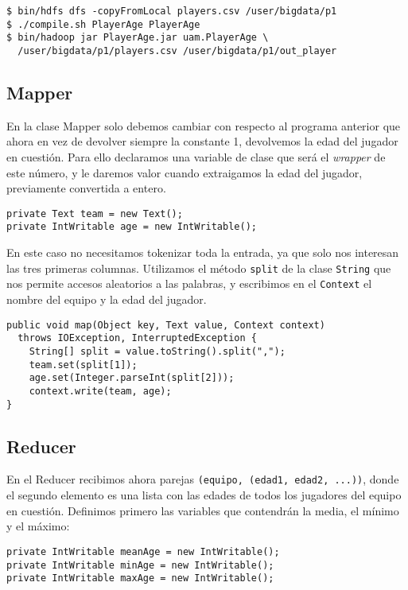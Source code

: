 \documentclass[11pt]{article}
\begin{document}
\begin{verbatim}
$ bin/hdfs dfs -copyFromLocal players.csv /user/bigdata/p1
$ ./compile.sh PlayerAge PlayerAge
$ bin/hadoop jar PlayerAge.jar uam.PlayerAge \
  /user/bigdata/p1/players.csv /user/bigdata/p1/out_player
\end{verbatim}

\subsection*{Mapper}

En la clase Mapper solo debemos cambiar con respecto al programa anterior que ahora en vez de devolver siempre la constante 1, devolvemos la edad del jugador en cuestión. Para ello declaramos una variable de clase que será el \textit{wrapper} de este número, y le daremos valor cuando extraigamos la edad del jugador, previamente convertida a entero.

\begin{verbatim}
private Text team = new Text();
private IntWritable age = new IntWritable();
\end{verbatim}

En este caso no necesitamos tokenizar toda la entrada, ya que solo nos interesan las tres primeras columnas. Utilizamos el método \verb|split| de la clase \verb|String| que nos permite accesos aleatorios a las palabras, y escribimos en el \verb|Context| el nombre del equipo y la edad del jugador.

\begin{verbatim}
public void map(Object key, Text value, Context context)
  throws IOException, InterruptedException {
    String[] split = value.toString().split(",");
    team.set(split[1]);
    age.set(Integer.parseInt(split[2]));
    context.write(team, age);
}
\end{verbatim}

\subsection*{Reducer}

En el Reducer recibimos ahora parejas \verb|(equipo, (edad1, edad2, ...))|, donde el segundo elemento es una lista con las edades de todos los jugadores del equipo en cuestión. Definimos primero las variables que contendrán la media, el mínimo y el máximo:

\begin{verbatim}
private IntWritable meanAge = new IntWritable();
private IntWritable minAge = new IntWritable();
private IntWritable maxAge = new IntWritable();
\end{verbatim}
\end{document}
